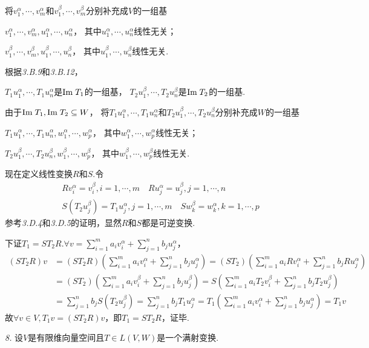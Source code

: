 将$v_1^\alpha,\cdots,v_m^\alpha$和$v_1^\beta,\cdots,v_m^\beta$分别补充成$V$的一组基

$v_1^\alpha,\cdots,v_m^\alpha,u_1^\alpha,\cdots,u_n^\alpha$，
其中$u_1^\alpha,\cdots,u_n^\alpha$线性无关；

$v_1^\beta,\cdots,v_m^\beta,u_1^\beta,\cdots,u_n^\beta$，
其中$u_1^\beta,\cdots,u_n^\beta$线性无关.

根据\textit{3.B.9}和\textit{3.B.12}，

$T_1u_1^\alpha,\cdots,T_1u_n^\alpha$是$\mathrm{Im \;} T_1$的一组基，
$T_2u_1^\beta,\cdots,T_2u_n^\beta$是$\mathrm{Im \;} T_2$的一组基.

由于$\mathrm{Im \;} T_1,\mathrm{Im \;} T_2 \subseteq W$，
将$T_1u_1^\alpha,\cdots,T_1u_n^\alpha$和$T_2u_1^\beta,\cdots,T_2u_n^\beta$分别补充成$W$的一组基

$T_1u_1^\alpha,\cdots,T_1u_n^\alpha,w_1^\alpha,\cdots,w_p^\alpha$，
其中$w_1^\alpha,\cdots,w_p^\alpha$线性无关；

$T_2u_1^\beta,\cdots,T_2u_n^\beta,w_1^\beta,\cdots,w_p^\beta$，
其中$w_1^\beta,\cdots,w_p^\beta$线性无关.

现在定义线性变换$R$和$S$.令
    \begin{align*}
        &Rv_i^\alpha=v_i^\beta,i=1,\cdots,m \quad Ru_j^\alpha=u_j^\beta,j=1,\cdots,n \\
        &S(T_2u_j^\beta)=T_1u_j^\alpha,j=1,\cdots,m \quad Sw_k^\beta=w_k^\alpha,k=1,\cdots,p
    \end{align*}
参考\textit{3.D.4}和\textit{3.D.5}的证明，显然$R$和$S$都是可逆变换.

下证$T_1=ST_2R$.$\forall v=\sum_{i=1}^m a_iv_i^\alpha+\sum_{j=1}^n b_ju_j^\alpha$，
    \begin{align*}
        (ST_2R)v &=(ST_2R)(\sum_{i=1}^m a_iv_i^\alpha+\sum_{j=1}^n b_ju_j^\alpha)
                =(ST_2)(\sum_{i=1}^m a_iRv_i^\alpha+\sum_{j=1}^n b_jRu_j^\alpha) \\
                &=(ST_2)(\sum_{i=1}^m a_iv_i^\beta+\sum_{j=1}^n b_ju_j^\beta)
                =S(\sum_{i=1}^m a_iT_2v_i^\beta+\sum_{j=1}^n b_jT_2u_j^\beta) \\
                &=\sum_{j=1}^n b_jS(T_2u_j^\beta)=\sum_{j=1}^n b_jT_1u_j^\alpha
                =T_1(\sum_{i=1}^m a_iv_i^\alpha+\sum_{j=1}^n b_ju_j^\alpha)=T_1v
    \end{align*}
故$\forall v \in V,T_1v=(ST_2R)v$，即$T_1=ST_2R$，证毕.

\newpage

\textit{8.}
设$V$是有限维向量空间且$T \in L(V,W)$是一个满射变换.

